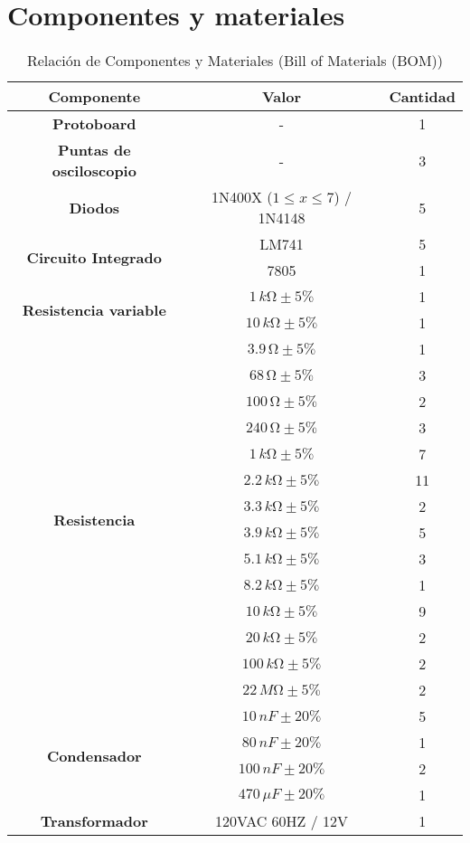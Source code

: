 
\section{Componentes y materiales}

\begin{table}[H]
    \centering
    \begin{tabular}{|c|c|c|}
        \hline
        \textbf{Componente} & \textbf{Valor} & \textbf{Cantidad} \\\hline
        \textbf{Protoboard} & - & 1 \\\hline
        \textbf{Puntas de osciloscopio} & - & 3 \\\hline
        \textbf{Diodos} & 1N400X ($1\leq x \leq 7$) / 1N4148 & 5 \\\hline
        \multirow{2}{5cm}{\centering \textbf{Circuito Integrado}}
         & LM741 & 5 \\
         & 7805 & 1 \\\hline
        \multirow{2}{5cm}{\centering \textbf{Resistencia variable}}
         & $1 \, k  \si{\ohm}\pm5 \%$ & 1 \\
         & $10 \, k  \si{\ohm}\pm5 \%$ & 1 \\\hline
        \multirow{14}{5cm}{\centering \textbf{Resistencia}}
        & $3.9 \, \si{\ohm}\pm5\%$ & 1 \\
        & $68 \, \si{\ohm}\pm5\%$ & 3 \\
        & $100 \, \si{\ohm}\pm5\%$ & 2 \\
        & $240 \, \si{\ohm}\pm5\%$ & 3 \\
        & $1 \, k  \si{\ohm}\pm5\%$ & 7 \\
        & $2.2 \, k  \si{\ohm}\pm5\%$ & 11 \\
        & $3.3 \, k  \si{\ohm}\pm5\%$ & 2 \\
        & $3.9 \, k  \si{\ohm}\pm5\%$ & 5 \\
        & $5.1 \, k  \si{\ohm}\pm5\%$ & 3 \\
        & $8.2 \, k  \si{\ohm}\pm5\%$ & 1 \\
        & $10 \, k  \si{\ohm}\pm5\%$ & 9 \\
        & $20 \, k  \si{\ohm}\pm5\%$ & 2 \\
        & $100 \, k  \si{\ohm}\pm5\%$ & 2 \\
        & $22 \, M  \si{\ohm}\pm5\%$ & 2 \\\hline
         \multirow{4}{5cm}{\centering \textbf{Condensador}}
        & $10 \,  nF\pm20\%$ & 5 \\
        & $80 \, nF\pm20\%$ & 1 \\
        & $100 \, nF\pm20\%$ & 2 \\
        & $470 \, \mu F\pm20\%$ & 1 \\\hline
        \textbf{Transformador} & 120VAC 60HZ / 12V & 1 \\\hline
    \end{tabular}
    \caption{Relación de Componentes y Materiales (Bill of Materials (BOM))}
    \label{tab:componentes}
\end{table}



\newpage